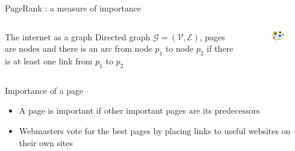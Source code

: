 \documentclass[10pt]{beamer}
\begin{document}
\begin{frame}{PageRank : a measure of importance}
\begin{columns}
    \begin{column}{5cm}
      \begin{block}{The internet as a graph}
        Directed graph $\mathcal{G}=(\mathcal{V},\mathcal{E})$, pages are nodes and there is an arc from node $p_1$ to node $p_2$ if there is at least one link from $p_1$ to $p_2$
      \end{block}
    \end{column}
    \begin{column}{5cm}
      \begin{figure}[r]
        \includegraphics[width =4.5cm]{PageRank-hi-res.png}
      \end{figure}
    \end{column}
  \end{columns}
\begin{block}{Importance of a page}
\begin{itemize}
\item A page is important if other important pages are its predecessors
\item Webmasters vote for the best pages by placing links to useful websites on their own sites
\end{itemize}
\end{block}
\end{frame}
\end{document}
